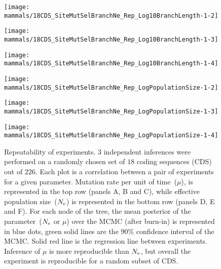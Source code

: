 \begin{figure}[htbp]
    \centering
    \begin{minipage}{0.32\linewidth}
        \texttt{[image: mammals/18CDS\_SiteMutSelBranchNe\_Rep\_Log10BranchLength-1-2]}
    \end{minipage}
    \hfill
    \begin{minipage}{0.32\linewidth}
        \texttt{[image: mammals/18CDS\_SiteMutSelBranchNe\_Rep\_Log10BranchLength-1-3]}
    \end{minipage}
    \hfill
    \begin{minipage}{0.32\linewidth}
        \texttt{[image: mammals/18CDS\_SiteMutSelBranchNe\_Rep\_Log10BranchLength-1-4]}
    \end{minipage}
    \hfill
    \begin{minipage}{0.32\linewidth}
        \texttt{[image: mammals/18CDS\_SiteMutSelBranchNe\_Rep\_LogPopulationSize-1-2]}
    \end{minipage}
    \hfill
    \begin{minipage}{0.32\linewidth}
        \texttt{[image: mammals/18CDS\_SiteMutSelBranchNe\_Rep\_LogPopulationSize-1-3]}
    \end{minipage}
    \hfill
    \begin{minipage}{0.32\linewidth}
        \texttt{[image: mammals/18CDS\_SiteMutSelBranchNe\_Rep\_LogPopulationSize-1-4]}
    \end{minipage}
    \hfill
    \caption[Repeatability of experiments]{
    Repeatability of experiments.
    $3$ independent inferences were performed on a randomly chosen set of $18$ coding sequences (\acrshort{CDS}) out of $226$.
    Each plot is a correlation between a pair of experiments for a given parameter.
    Mutation rate per unit of time~($\mu$), is represented in the top row (panels A, B and C), while effective population size~($N_{\text{e}}$) is represented in the bottom row (panels D, E and F).
    For each node of the tree, the mean posterior of the parameter~($N_{\text{e}}$ or $\mu$) over the \acrshort{MCMC} (after burn-in) is represented in blue dots, green solid lines are the $90\%$ confidence interval of the \acrshort{MCMC}.
    Solid red line is the regression line between experiments.
    Inference of $\mu$ is more reproducible than $N_{\text{e}}$, but overall the experiment is reproducible for a random subset of \acrshort{CDS}.
    }
    \label{fig:mammals_repeatability}
\end{figure}


